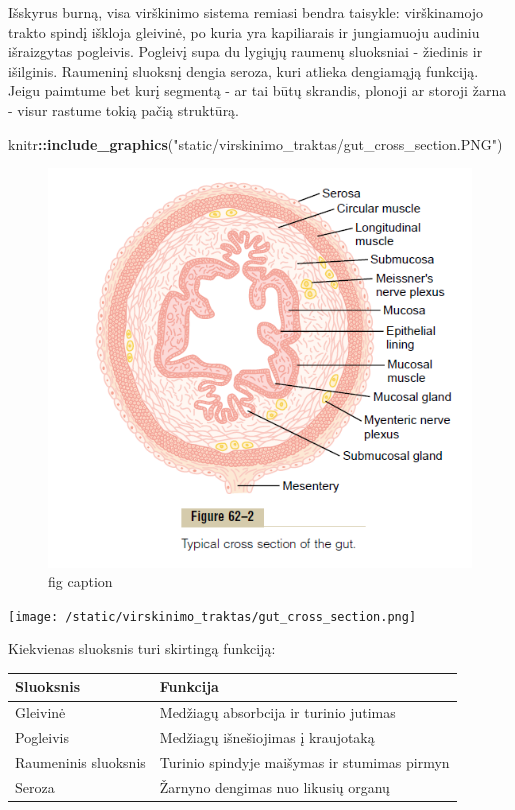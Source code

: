 \documentclass[]{book}
\newenvironment{Shaded}{\begin{snugshade}}{\end{snugshade}}
\newcommand{\KeywordTok}[1]{\textcolor[rgb]{0.13,0.29,0.53}{\textbf{#1}}}
\newcommand{\NormalTok}[1]{#1}
\newcommand{\OperatorTok}[1]{\textcolor[rgb]{0.81,0.36,0.00}{\textbf{#1}}}
\newcommand{\StringTok}[1]{\textcolor[rgb]{0.31,0.60,0.02}{#1}}
\begin{document}
Išskyrus burną, visa virškinimo sistema remiasi bendra taisykle: virškinamojo trakto spindį iškloja gleivinė, po kuria yra kapiliarais ir jungiamuoju audiniu išraizgytas pogleivis. Pogleivį supa du lygiųjų raumenų sluoksniai - žiedinis ir išilginis. Raumeninį sluoksnį dengia seroza, kuri atlieka dengiamąją funkciją. Jeigu paimtume bet kurį segmentą - ar tai būtų skrandis, plonoji ar storoji žarna - visur rastume tokią pačią struktūrą.

\begin{Shaded}
\begin{Highlighting}[]
\NormalTok{knitr}\OperatorTok{::}\KeywordTok{include_graphics}\NormalTok{(}\StringTok{"static/virskinimo_traktas/gut_cross_section.PNG"}\NormalTok{)}
\end{Highlighting}
\end{Shaded}

\begin{figure}
\includegraphics[width=7.42in]{static/virskinimo_traktas/gut_cross_section} \caption{fig caption}\label{fig:my-fig}
\end{figure}

\texttt{[image: /static/virskinimo\_traktas/gut\_cross\_section.png]}

Kiekvienas sluoksnis turi skirtingą funkciją:

\begin{tabular}{l|l}
\hline
Sluoksnis & Funkcija\\
\hline
Gleivinė & Medžiagų absorbcija ir turinio jutimas\\
\hline
Pogleivis & Medžiagų išnešiojimas į kraujotaką\\
\hline
Raumeninis sluoksnis & Turinio spindyje maišymas ir stumimas pirmyn\\
\hline
Seroza & Žarnyno dengimas nuo likusių organų\\
\hline
\end{tabular}
\end{document}
